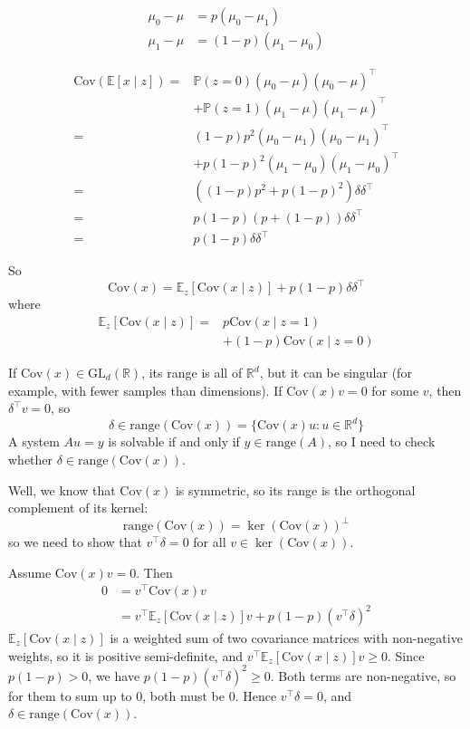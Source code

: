 \documentclass[10pt,a4paper,twocolumn]{article}
\newcommand{\R}{\mathbb{R}}
\begin{document}
	$$\begin{aligned}
		\mu_0 - \mu & = p (\mu_0 - \mu_1) \\
		\mu_1 - \mu & = (1 - p) (\mu_1 - \mu_0)
	\end{aligned}$$

	$$\begin{aligned}
		\mathrm{Cov}(\mathbb{E}[x \mid z]) = {} & \mathbb{P}(z = 0) (\mu_0 - \mu) (\mu_0 - \mu)^\top \\
		& + \mathbb{P}(z = 1) (\mu_1 - \mu) (\mu_1 - \mu)^\top \\
		= {} & (1 - p) p^2 (\mu_0 - \mu_1) (\mu_0 - \mu_1)^\top \\
		& + p (1 - p)^2 (\mu_1 - \mu_0) (\mu_1 - \mu_0)^\top \\
		= {} & \left( (1 - p) p^2 + p (1 - p)^2 \right) \delta \delta^\top \\
		= {} & p (1 - p) \left( p + (1 - p) \right) \delta \delta^\top \\
		= {} & p (1 - p) \delta \delta^\top
	\end{aligned}$$

	So
	$$\mathrm{Cov}(x) = \mathbb{E}_z \left[ \mathrm{Cov}(x \mid z) \right] + p (1 - p) \delta \delta^\top$$
	where
	$$\begin{aligned}
		\mathbb{E}_z \left[ \mathrm{Cov}(x \mid z) \right] = {} & p \mathrm{Cov}(x \mid z = 1) \\
		& + (1 - p) \mathrm{Cov}(x \mid z = 0)
	\end{aligned}$$

	If $\mathrm{Cov}(x) \in \mathrm{GL}_d(\R)$, its range is all of $\R^d$, but it can be singular (for example, with fewer samples than dimensions). If $\mathrm{Cov}(x) v = 0$ for some $v$, then $\delta^\top v = 0$, so
	$$\delta \in \mathrm{range}(\mathrm{Cov}(x)) = \{ \mathrm{Cov}(x) u : u \in \R^d \}$$
	A system $A u = y$ is solvable if and only if $y \in \mathrm{range}(A)$, so I need to check whether $\delta \in \mathrm{range}(\mathrm{Cov}(x))$.

	Well, we know that $\mathrm{Cov}(x)$ is symmetric, so its range is the orthogonal complement of its kernel:
	$$\mathrm{range}(\mathrm{Cov}(x)) = \ker(\mathrm{Cov}(x))^\perp$$
	so we need to show that $v^\top \delta = 0$ for all $v \in \ker(\mathrm{Cov}(x))$.

	Assume $\mathrm{Cov}(x) v = 0$. Then
	$$\begin{aligned}
		0 & = v^\top \mathrm{Cov}(x) v \\
		& = v^\top \mathbb{E}_z \left[ \mathrm{Cov}(x \mid z) \right] v + p (1 - p) (v^\top \delta)^2
	\end{aligned}$$
	$\mathbb{E}_z \left[ \mathrm{Cov}(x \mid z) \right]$ is a weighted sum of two covariance matrices with non-negative weights, so it is positive semi-definite, and $v^\top \mathbb{E}_z \left[ \mathrm{Cov}(x \mid z) \right] v \ge 0$. Since $p (1 - p) > 0$, we have $p (1 - p) (v^\top \delta)^2 \ge 0$. Both terms are non-negative, so for them to sum up to $0$, both must be $0$. Hence $v^\top \delta = 0$, and $\delta \in \mathrm{range}(\mathrm{Cov}(x))$.
\end{document}
